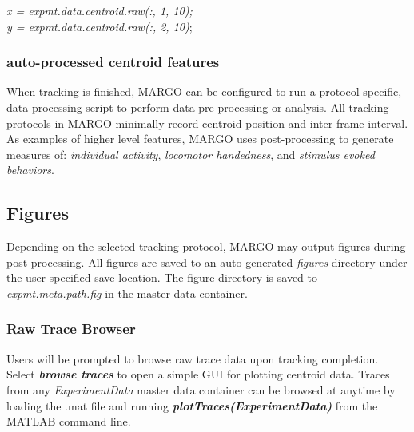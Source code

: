 \documentclass[11pt]{article}
\begin{document}
\begin{center}
	 \textit{x = expmt.data.centroid.raw(:, 1, 10);}\\
	\textit{y = expmt.data.centroid.raw(:, 2, 10)};
\end{center}

\subsubsection{auto-processed centroid features}

When tracking is finished, MARGO can be configured to run a protocol-specific, data-processing script to perform data pre-processing or analysis. All tracking protocols in MARGO minimally record centroid position and inter-frame interval. As examples of higher level features, MARGO uses post-processing to generate measures of:  \textit{individual activity},  \textit{locomotor handedness}, and  \textit{stimulus evoked behaviors}.

\subsection{Figures}

Depending on the selected tracking protocol, MARGO may output figures during post-processing. All figures are saved to an auto-generated \textit{figures} directory under the user specified save location. The figure directory is saved to \textit{expmt.meta.path.fig} in the master data container.


\subsubsection{Raw Trace Browser}

Users will be prompted to browse raw trace data upon tracking completion. Select \textbf{\textit{browse traces}} to open a simple GUI for plotting centroid data. Traces from any \textit{\textit{ExperimentData}} master data container can be browsed at anytime by loading the .mat file and running \textbf{\textit{plotTraces(\textit{ExperimentData})}} from the MATLAB command line.
\end{document}
